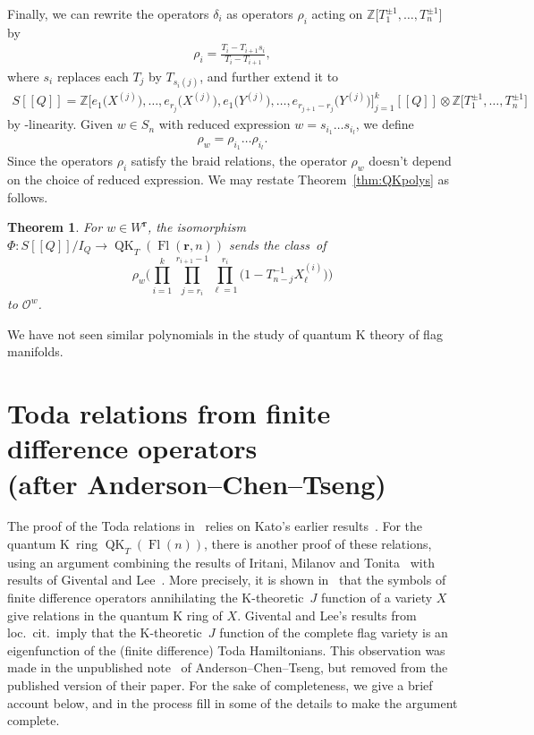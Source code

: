 \documentclass[pdftex]{sigma}
\numberwithin{equation}{section}
\newtheorem{Theorem}{Theorem}[section]
\theoremstyle{definition}
\newcommand{\dbb}[1]{[\![#1]\!]}
\DeclareMathOperator{\Fl}{Fl}
\DeclareMathOperator{\QK}{QK}
\newcommand{\bfr}{{\mathbf r}}
\newcommand{\Z}{{\mathbb Z}}
\newcommand{\cO}{{\mathcal O}}
\begin{document}
Finally, we can rewrite the operators $\delta_i$ as operators $\rho_i$ acting on $\Z\bigl[T_1^{\pm1},\dots,T_n^{\pm1}\bigr]$ by
\begin{align*}
 \rho_i=\frac{T_i-T_{i+1}s_i}{T_i-T_{i+1}},
\end{align*}
where $s_i$ replaces each $T_j$ by $T_{s_i(j)}$, and further extend it to
\begin{align*}
 S\dbb{Q}=\Z\bigl[e_1\bigl(X^{(j)}\bigr),\dots, e_{r_j}\bigl(X^{(j)}\bigr),e_1\bigl(Y^{(j)}\bigr),\dots,e_{r_{j+1}-r_j}\bigl(Y^{(j)}\bigr)\bigr]_{j=1}^k\dbb{Q}\otimes \Z\bigl[T_1^{\pm1},\dots,T_n^{\pm1}\bigr]
\end{align*}
by \smash{$\Z\bigl[e_1\bigl(X^{(j)}\bigr),\dots, e_{r_j}\bigl(X^{(j)}\bigr),e_1\bigl(Y^{(j)}\bigr),\dots,e_{r_{j+1}-r_j}\bigl(Y^{(j)}\bigr)\bigr]_{j=1}^k\dbb{Q}$}-linearity. Given $w\in S_{n}$ with reduced expression $w=s_{i_1}\dots s_{i_l}$, we define
\begin{align*}
 \rho_w=\rho_{i_1}\dots\rho_{i_l}.
\end{align*}
Since the operators $\rho_i$ satisfy the braid relations, the operator $\rho_w$ doesn't depend on the choice of reduced expression. We may restate Theorem~\ref{thm:QKpolys} as follows.

\begin{Theorem}\label{thm:double-Grothendieck}
 For $w\in W^\bfr$, the isomorphism $\Phi\colon S\dbb{Q}/I_Q\to \QK_T(\Fl(\bfr,n))$ sends the class~of
 \[\rho_w\Biggl(\prod_{i=1}^{k}\prod_{j=r_i}^{r_{i+1}-1}\prod_{\ell=1}^{r_i}\bigl(1-T_{n-j}^{-1}X^{(i)}_\ell\bigr)\Biggr) \]
 to $\cO^w$.
\end{Theorem}
We have not seen similar polynomials in the study of quantum K theory of flag manifolds.

\appendix

\section[Toda relations from finite difference operators (after Anderson--Chen--Tseng)]{Toda relations from finite difference operators\\ (after Anderson--Chen--Tseng)}\label{sec:toda}

The proof of the Toda relations in~\cite{maeno.naito.sagaki:QKideal}
relies on Kato's earlier results~\cite{kato:loop}. For the quantum K~ring
$\QK_T(\Fl(n))$, there is another proof of these relations, using an argument
combining the results of Iritani, Milanov and
Tonita~\cite{Iritani:2013qka} with results of Givental
and Lee~\cite{givental_lee}. More precisely, it is shown in~\cite{Iritani:2013qka} that
the symbols of finite
difference operators annihilating the K-theoretic~$J$ function of a variety $X$ give relations in the quantum K ring of $X$. Givental and Lee's results from loc.\ cit.\ imply that the
K-theoretic~$J$ function of the complete flag variety is an eigenfunction of the
(finite difference) Toda Hamiltonians. This observation was made in the unpublished note~\cite{act:2017} of Anderson--Chen--Tseng, but removed from the published version of their paper. For the sake of completeness, we give a brief account below, and in the process fill in some of the details to make the argument complete.
\end{document}
